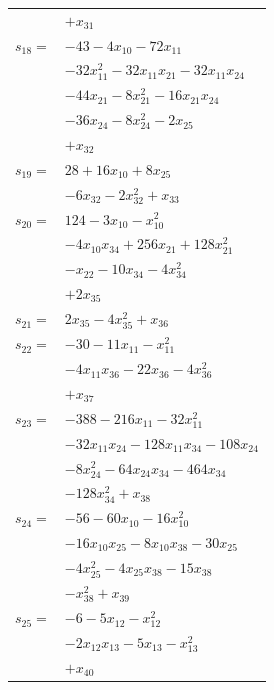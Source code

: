 \begin{longtable}{@{}r@{\;}l@{}}
 & \(\displaystyle +x_{31}\) \\[3pt]
\(s_{18}=\) & \(\displaystyle -43 -4x_{10} -72x_{11}\) \\
 & \(\displaystyle -32x_{11}^{2} -32x_{11}x_{21} -32x_{11}x_{24}\) \\
 & \(\displaystyle -44x_{21} -8x_{21}^{2} -16x_{21}x_{24}\) \\
 & \(\displaystyle -36x_{24} -8x_{24}^{2} -2x_{25}\) \\
 & \(\displaystyle +x_{32}\) \\[3pt]
\(s_{19}=\) & \(\displaystyle 28 +16x_{10} +8x_{25}\) \\
 & \(\displaystyle -6x_{32} -2x_{32}^{2} +x_{33}\) \\[3pt]
\(s_{20}=\) & \(\displaystyle 124 -3x_{10} -x_{10}^{2}\) \\
 & \(\displaystyle -4x_{10}x_{34} +256x_{21} +128x_{21}^{2}\) \\
 & \(\displaystyle -x_{22} -10x_{34} -4x_{34}^{2}\) \\
 & \(\displaystyle +2x_{35}\) \\[3pt]
\(s_{21}=\) & \(\displaystyle 2x_{35} -4x_{35}^{2} +x_{36}\) \\[3pt]
\(s_{22}=\) & \(\displaystyle -30 -11x_{11} -x_{11}^{2}\) \\
 & \(\displaystyle -4x_{11}x_{36} -22x_{36} -4x_{36}^{2}\) \\
 & \(\displaystyle +x_{37}\) \\[3pt]
\(s_{23}=\) & \(\displaystyle -388 -216x_{11} -32x_{11}^{2}\) \\
 & \(\displaystyle -32x_{11}x_{24} -128x_{11}x_{34} -108x_{24}\) \\
 & \(\displaystyle -8x_{24}^{2} -64x_{24}x_{34} -464x_{34}\) \\
 & \(\displaystyle -128x_{34}^{2} +x_{38}\) \\[3pt]
\(s_{24}=\) & \(\displaystyle -56 -60x_{10} -16x_{10}^{2}\) \\
 & \(\displaystyle -16x_{10}x_{25} -8x_{10}x_{38} -30x_{25}\) \\
 & \(\displaystyle -4x_{25}^{2} -4x_{25}x_{38} -15x_{38}\) \\
 & \(\displaystyle -x_{38}^{2} +x_{39}\) \\[3pt]
\(s_{25}=\) & \(\displaystyle -6 -5x_{12} -x_{12}^{2}\) \\
 & \(\displaystyle -2x_{12}x_{13} -5x_{13} -x_{13}^{2}\) \\
 & \(\displaystyle +x_{40}\) \\[3pt]

\end{longtable}
